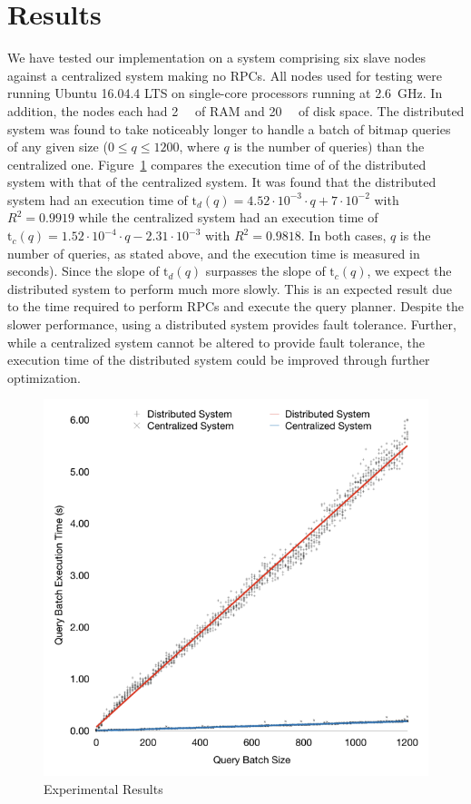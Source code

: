 \section{Results}
We have tested our implementation on a system comprising six slave nodes
against a centralized system making no RPCs. All nodes used for testing were
running Ubuntu 16.04.4 LTS on single-core processors running at
\SI{2.6}{\giga\hertz}. In addition, the nodes each had \SI{2}{\gibi\byte}
of RAM and \SI{20}{\gibi\byte} of disk space. The distributed system was found
to take noticeably longer to handle a batch of bitmap queries of any given size
(\(0 \leq q \leq 1200\), where \(q\) is the number of queries) than the
centralized one. Figure~\ref{fig:graph-of-results} compares the execution time
of of the distributed system with that of the centralized system. It was found
that the distributed system had an execution time of
\(\mathrm{t}_d(q) = 4.52 \cdot 10^{-3} \cdot q + 7 \cdot 10^{-2}\)
with \(R^2 = 0.9919\) while the centralized system had an execution time of
\(\mathrm{t}_c(q) = 1.52 \cdot 10^{-4} \cdot q - 2.31 \cdot 10^{-3}\)
with \(R^2 = 0.9818\). In both cases, \(q\) is the number of queries, as stated
above, and the execution time is measured in seconds). Since the slope of
\(\mathrm{t}_d(q)\) surpasses the slope of \(\mathrm{t}_c(q)\), we expect the
distributed system to perform much more slowly. This is an expected result due
to the time required to perform RPCs and execute the query planner. Despite the
slower performance, using a distributed system provides fault tolerance.
Further, while a centralized system cannot be altered to provide fault
tolerance, the execution time of the distributed system could be improved
through further optimization.
%
\begin{figure}
    \centering
    \includegraphics[width=\columnwidth]{query-experiment-results}
    \caption{Experimental Results}\label{fig:graph-of-results}
\end{figure}
